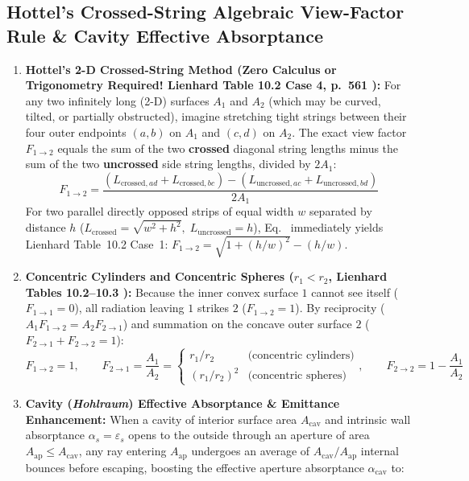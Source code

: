 \subsection{Hottel's Crossed-String Algebraic View-Factor Rule \& Cavity Effective Absorptance}
\begin{enumerate}
  \item \textbf{Hottel's 2-D Crossed-String Method (Zero Calculus or Trigonometry Required! Lienhard Table 10.2 Case 4, p.~561 ):} For any two infinitely long (2-D) surfaces $A_1$ and $A_2$ (which may be curved, tilted, or partially obstructed), imagine stretching tight strings between their four outer endpoints $(a, b)$ on $A_1$ and $(c, d)$ on $A_2$. The exact view factor $F_{1\to 2}$ equals the sum of the two \textbf{crossed} diagonal string lengths minus the sum of the two \textbf{uncrossed} side string lengths, divided by $2 A_1$:
  \begin{equation}
    \boxed{F_{1\to 2} = \frac{\left(L_{\mathrm{crossed},ad} + L_{\mathrm{crossed},bc}\right) - \left(L_{\mathrm{uncrossed},ac} + L_{\mathrm{uncrossed},bd}\right)}{2 A_1}}
    \label{eq:12:hottel-strings}
  \end{equation}
  For two parallel directly opposed strips of equal width $w$ separated by distance $h$ ($L_{\mathrm{crossed}} = \sqrt{w^2 + h^2},\; L_{\mathrm{uncrossed}} = h$), Eq.~ immediately yields Lienhard Table~10.2 Case~1: $F_{1\to 2} = \sqrt{1 + (h/w)^2} - (h/w)$.
  \item \textbf{Concentric Cylinders and Concentric Spheres ($r_1 < r_2$, Lienhard Tables 10.2--10.3 ):} Because the inner convex surface $1$ cannot see itself ($F_{1\to 1} = 0$), all radiation leaving $1$ strikes $2$ ($F_{1\to 2} = 1$). By reciprocity ($A_1 F_{1\to 2} = A_2 F_{2\to 1}$) and summation on the concave outer surface $2$ ($F_{2\to 1} + F_{2\to 2} = 1$):
  \begin{equation}
    F_{1\to 2} = 1, \qquad F_{2\to 1} = \frac{A_1}{A_2} = \begin{cases} r_1 / r_2 & \text{(concentric cylinders)} \\ (r_1 / r_2)^2 & \text{(concentric spheres)} \end{cases}, \qquad F_{2\to 2} = 1 - \frac{A_1}{A_2}
    \label{eq:12:concentric-vf}
  \end{equation}
  \item \textbf{Cavity (\emph{Hohlraum}) Effective Absorptance \& Emittance Enhancement:} When a cavity of interior surface area $A_{\mathrm{cav}}$ and intrinsic wall absorptance $\alpha_s = \varepsilon_s$ opens to the outside through an aperture of area $A_{\mathrm{ap}} \le A_{\mathrm{cav}}$, any ray entering $A_{\mathrm{ap}}$ undergoes an average of $A_{\mathrm{cav}}/A_{\mathrm{ap}}$ internal bounces before escaping, boosting the effective aperture absorptance $\alpha_{\mathrm{cav}}$ to:

\end{enumerate}

